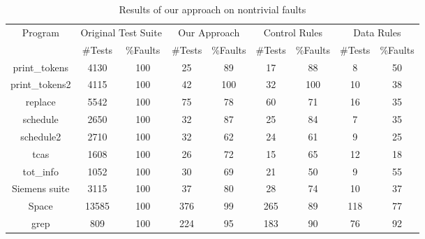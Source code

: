 \documentclass{sig-alternate}
\begin{document}
\begin{table}[htbp]
\caption{Results of our approach on nontrivial
faults}\label{tab:our:nontrivial} \center
\begin{tabular}{|c|c|c|c|c|c|c|c|c|}

\hline Program   & \multicolumn{2}{c}{Original Test Suite} \vline &
\multicolumn{2}{c}{Our Approach} \vline
& \multicolumn{2}{c}{Control Rules} \vline & \multicolumn{2}{c}{Data Rules} \vline   \\

\cline{2-9}  & \#Tests &   \%Faults & \#Tests &   \%Faults &
\#Tests &   \%Faults & \#Tests &   \%Faults \\
\hline  print\_tokens   &   4130    &   100 &   25  &   89  &   17  &   88  &   8   &   50  \\
\hline  print\_tokens2  &   4115    &   100 &   42  &   100 &   32  &   100 &   10  &   38  \\
\hline  replace &   5542    &   100 &   75  &   78  &   60  &   71  &   16  &   35  \\
\hline  schedule    &   2650    &   100 &   32  &   87  &   25  &   84  &   7   &   35  \\
\hline  schedule2   &   2710    &   100 &   32  &   62  &   24  &   61  &   9   &   25  \\
\hline  tcas    &   1608    &   100 &   26  &   72  &   15  &   65  &   12  &   18  \\
\hline  tot\_info &   1052    &   100 &   30  &   69  &   21  &   50  &   9   &   55  \\
\hline  Siemens suite   &   3115    &   100 &   37  &   80  &   28  &   74  &   10  &   37  \\
\hline  Space   &   13585   &   100 &   376 &   99  &   265 &   89  &   118 &   77  \\
\hline  grep    &   809 &   100 &   224 &   95  &   183 &   90  &   76  &   92  \\

\hline
\end{tabular}
\end{table}
\end{document}
